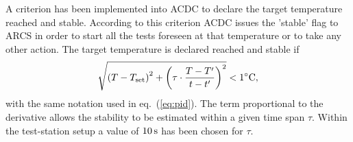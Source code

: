 A criterion has been implemented into ACDC to declare the target temperature reached and stable. According to this criterion ACDC issues the 'stable' flag to ARCS in order to start all the tests foreseen at that temperature or to take any other action. The target temperature is declared reached and stable if
\begin{equation}
\sqrt{\left(T-T_{\rm set} \right)^2 + \left( \tau\cdot\frac{T-T'}{t-t'}\right)^2} < 1^{\circ}{\rm C},
\end{equation}
with the same notation used in eq.~(\ref{eq:pid}). The term proportional to the derivative allows the stability to be estimated within a given time span $\tau$. Within the test-station setup a value of $10\rm \, s$ has been chosen for $\tau$.  


